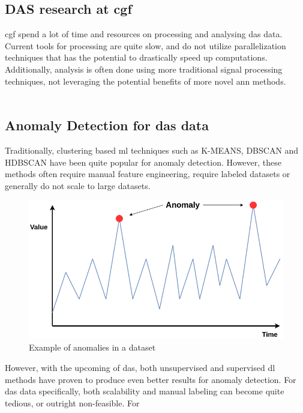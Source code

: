 \subsection{DAS research at \acrshort{cgf}}

\acrfull{cgf} spend a lot of time and resources on processing and analysing \acrshort{das} data. Current tools for processing are quite slow, and do not utilize parallelization techniques that has the potential to drastically speed up computations. Additionally, analysis is often done using more traditional signal processing techniques, not leveraging the potential benefits of more novel \acrshort{ann} methods. \\ \\  


\subsection{Anomaly Detection for \acrshort{das} data}

Traditionally, clustering based \acrfull{ml} techniques such as K-MEANS, DBSCAN and HDBSCAN have been quite popular for anomaly detection. However, these methods often require manual feature engineering, require labeled datasets or generally do not scale to large datasets. 

\begin{figure}[ht]
    \centering
    \includegraphics[scale=0.4]{figures/anolay_line.png}
    \caption{Example of anomalies in a dataset}
    \label{fig:anomaly_example}
\end{figure}


However, with the upcoming of \acrshort{das}, both unsupervised and supervised \acrfull{dl} methods have proven to produce even better results for anomaly detection. For \acrshort{das} data specifically, both scalability and manual labeling can become quite tedious, or outright non-feasible. For 


